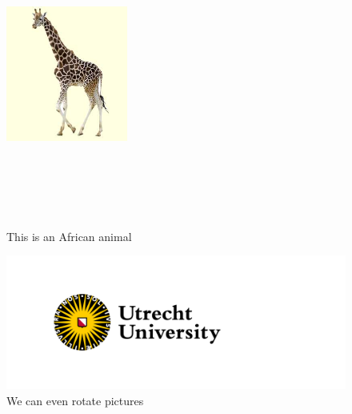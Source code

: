 \documentclass[thesis]{subfiles}
\begin{document}
\begin{figure}[h!]
    \includegraphics[height = 10cm, width = 4cm]{Giraffe_klein.jpg}
    \caption{This is an African animal}
    \label{fig:Lang}
\end{figure}

\begin{figure}[b!]
    \includegraphics[scale = 0.9, angle = 31.4159]{uulogoEN.png}
    \caption{We can even rotate pictures}
    \label{fig:asbak}
\end{figure}
\clearpage
\end{document}
